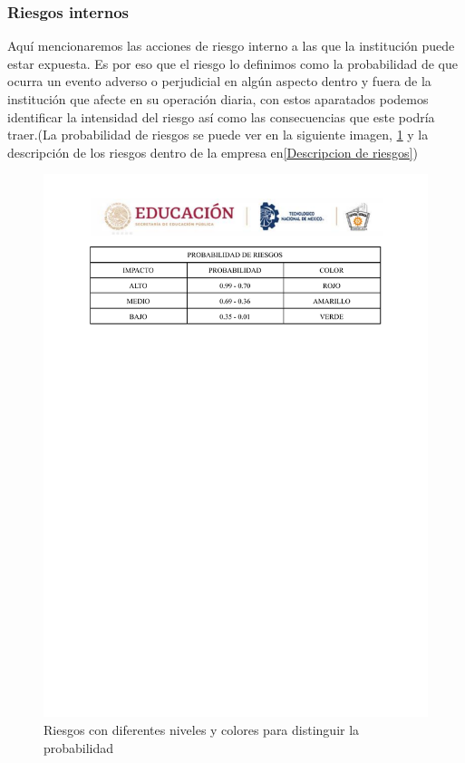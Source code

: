     \subsubsection{Riesgos internos}
    Aquí mencionaremos las acciones de riesgo interno a las que la institución puede estar  expuesta. 
    Es por eso que el riesgo lo definimos como la probabilidad de que ocurra un evento adverso o perjudicial en algún aspecto dentro y fuera de la institución que afecte en su operación diaria, con estos aparatados podemos identificar la intensidad del riesgo así como las consecuencias que este podría traer.(La probabilidad de riesgos se puede ver en la siguiente imagen, \ref{Probabilidda de riesgos} y la descripción de los riesgos dentro de la empresa en\ref{Descripcion de riesgos})
    \begin{figure}
        \centering
        \includegraphics[trim = {0mm 210mm 0mm 0mm},clip,scale=0.3]{24/Img/probabilidaddeRiesgos.pdf}
        \caption{Riesgos con diferentes niveles y colores para distinguir la probabilidad}
        \label{Probabilidda de riesgos}
    \end{figure}
